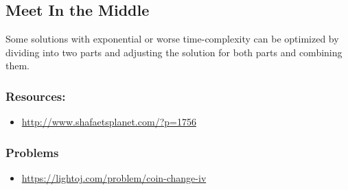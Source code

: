 \subsection{Meet In the Middle}
Some solutions with exponential or worse time-complexity can be optimized by dividing into two parts and adjusting the solution for both parts and combining them.
\subsubsection*{Resources:}
\begin{itemize}
\item \url{http://www.shafaetsplanet.com/?p=1756}
\end{itemize}
\subsubsection*{Problems}
\begin{itemize}
\item \url{https://lightoj.com/problem/coin-change-iv}
\end{itemize}